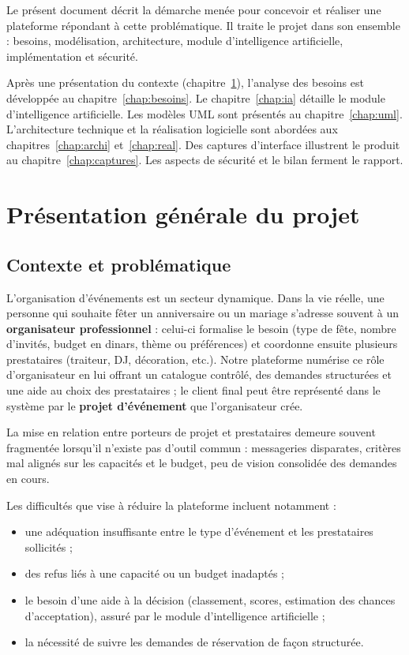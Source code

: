 \documentclass[a4paper,12pt]{report}
\begin{document}
\noindent
Le présent document décrit la démarche menée pour concevoir et réaliser une plateforme répondant à cette problématique. Il traite le projet dans son ensemble : besoins, modélisation, architecture, module d'intelligence artificielle, implémentation et sécurité.

\vspace{0.5em}

\noindent
Après une présentation du contexte (chapitre~\ref{chap:presentation}), l'analyse des besoins est développée au chapitre~\ref{chap:besoins}. Le chapitre~\ref{chap:ia} détaille le module d'intelligence artificielle. Les modèles UML sont présentés au chapitre~\ref{chap:uml}. L'architecture technique et la réalisation logicielle sont abordées aux chapitres~\ref{chap:archi} et~\ref{chap:real}. Des captures d'interface illustrent le produit au chapitre~\ref{chap:captures}. Les aspects de sécurité et le bilan ferment le rapport.

\chapter{Présentation générale du projet}
\label{chap:presentation}

\section{Contexte et problématique}

L'organisation d'événements est un secteur dynamique. Dans la vie réelle, une personne qui souhaite fêter un anniversaire ou un mariage s'adresse souvent à un \textbf{organisateur professionnel} : celui-ci formalise le besoin (type de fête, nombre d'invités, budget en dinars, thème ou préférences) et coordonne ensuite plusieurs prestataires (traiteur, DJ, décoration, etc.). Notre plateforme numérise ce rôle d'organisateur en lui offrant un catalogue contrôlé, des demandes structurées et une aide au choix des prestataires ; le client final peut être représenté dans le système par le \textbf{projet d'événement} que l'organisateur crée.

La mise en relation entre porteurs de projet et prestataires demeure souvent fragmentée lorsqu'il n'existe pas d'outil commun : messageries disparates, critères mal alignés sur les capacités et le budget, peu de vision consolidée des demandes en cours.

Les difficultés que vise à réduire la plateforme incluent notamment :
\begin{itemize}[leftmargin=*]
  \item une adéquation insuffisante entre le type d'événement et les prestataires sollicités ;
  \item des refus liés à une capacité ou un budget inadaptés ;
  \item le besoin d'une aide à la décision (classement, scores, estimation des chances d'acceptation), assuré par le module d'intelligence artificielle ;
  \item la nécessité de suivre les demandes de réservation de façon structurée.
\end{itemize}
\end{document}
